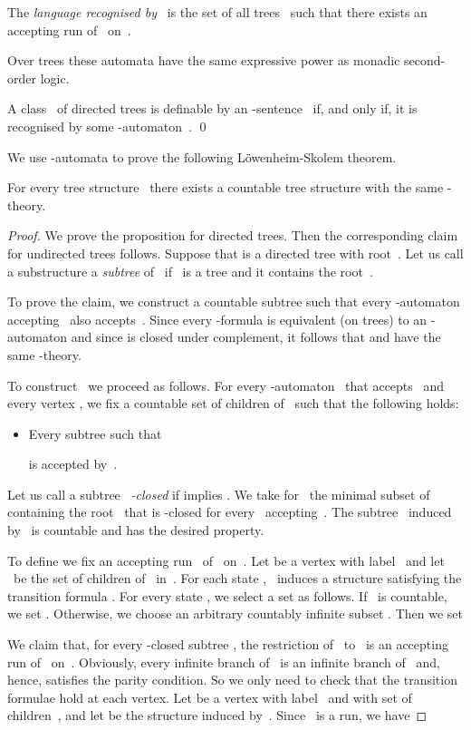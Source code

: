 \documentclass{LMCS}
\begin{document}
\begin{thm}
\begin{defi}
The \emph{language recognised by~} is the set 
of all trees~ such that there exists an accepting run
of~ on~.
\end{defi}

Over trees these automata have the same expressive power as monadic second-order logic.
\begin{thm}
A class~ of directed trees is definable
by an -sentence~ if, and only if,
it is recognised by some -automaton~.
\qed\end{thm}

We use -automata to prove the following L\"owenheim-Skolem theorem.
\begin{prop}\label{prop:Loewenheim-Skolem for trees}
For every tree structure~ there exists a countable tree structure 
with the same -theory.
\end{prop}
\begin{proof}
We prove the proposition for directed trees.
Then the corresponding claim for undirected trees follows.
Suppose that  is a directed tree with root~.
Let us call a substructure  a
\emph{subtree} of~ if ~is a tree and it contains the root~.

To prove the claim, we construct a countable subtree 
such that every -automaton accepting~ also accepts~.
Since every -formula is equivalent (on trees) to an -automaton
and since  is closed under complement, it follows that
 and  have the same -theory.

To construct~ we proceed as follows.
For every -automaton~ that accepts~ and every vertex
, we fix a countable set  of children of~
such that the following holds\?:
\begin{itemize}[label=]
\item Every subtree  such that
  
  is accepted by~.
\end{itemize}
Let us call a subtree~ \emph{-closed} if
 implies .
We take for~ the minimal subset of~ containing
the root~ that is -closed for every~ accepting~.
The subtree~ induced by~ is countable and has the desired property.

To define  we fix an accepting run~ of~ on~.
Let  be a vertex with label~ and let ~be the set of children
of~ in~.
For each state , ~induces a structure 
satisfying the transition formula .
For every state , we select a set  as follows.
If ~is countable, we set .
Otherwise, we choose an arbitrary countably infinite subset .
Then we set


We claim that, for every -closed subtree ,
the restriction of~ to~ is an accepting run of~ on~.
Obviously, every infinite branch of~ is an infinite branch of~
and, hence, satisfies the parity condition. So we only need to check
that the transition formulae hold at each vertex.
Let  be a vertex with label~ and with set of children~, and
let  be the structure induced by~.
Since ~is a run, we have


\end{proof}
\end{thm}
\end{document}
